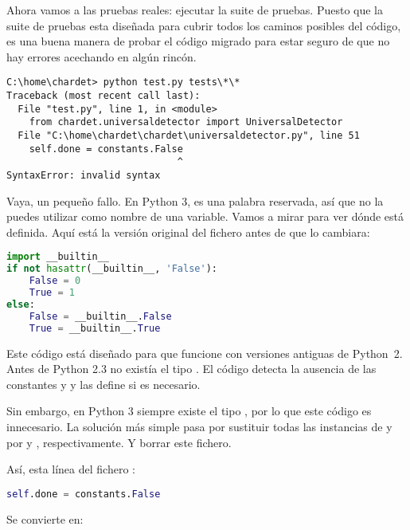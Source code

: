 Ahora vamos a las pruebas reales: ejecutar la suite de pruebas. Puesto que la suite de pruebas esta diseñada para cubrir todos los caminos posibles del código, es una buena manera de probar el código migrado para estar seguro de que no hay errores acechando en algún rincón.

\noindent\begin{minipage}{\textwidth}
\begin{lstlisting}[breaklines=true]
C:\home\chardet> python test.py tests\*\*
Traceback (most recent call last):
  File "test.py", line 1, in <module>
    from chardet.universaldetector import UniversalDetector
  File "C:\home\chardet\chardet\universaldetector.py", line 51
    self.done = constants.False
                              ^
SyntaxError: invalid syntax
\end{lstlisting}
\end{minipage}

Vaya, un pequeño fallo. En Python 3,  es una palabra reservada, así que no la puedes utilizar como nombre de una variable. Vamos a mirar  para ver dónde está definida. Aquí está la versión original del fichero antes de que  lo cambiara:


\begin{lstlisting}[language=Python,breaklines=true]
import __builtin__
if not hasattr(__builtin__, 'False'):
    False = 0
    True = 1
else:
    False = __builtin__.False
    True = __builtin__.True
\end{lstlisting}

Este código está diseñado para que funcione con versiones antiguas de \mbox{Python 2}. Antes de Python 2.3 no existía el tipo . El código detecta la ausencia de las constantes  y  y las define si es necesario.

Sin embargo, en Python 3 siempre existe el tipo , por lo que este código es innecesario. La solución más simple pasa por sustituir todas las instancias de  y  por  y , respectivamente. Y borrar este fichero.

Así, esta línea del fichero :

\begin{lstlisting}[language=Python,breaklines=true]
self.done = constants.False
\end{lstlisting}

Se convierte en:

